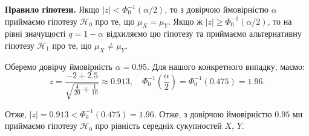 \documentclass{../hw_template}
\begin{document}
\textbf{Правило гіпотези.} Якщо $|z| < \Phi_0^{-1}(\alpha/2)$, то з довірчою
ймовірністю $\alpha$ приймаємо гіпотезу $\mathcal{H}_0$ про те, що $\mu_X =
\mu_Y$. Якщо ж $|z| \geq \Phi_0^{-1}(\alpha/2)$, то на рівні значущості
$q=1-\alpha$ відхиляємо цю гіпотезу та приймаємо альтернативну гіпотезу
$\mathcal{H}_1$ про те, що $\mu_X \neq \mu_Y$. 

Оберемо довірчу ймовірність $\alpha = 0.95$. Для нашого конкретного випадку, маємо:
\begin{equation*}
    z = \frac{-2 + 2.5}{\sqrt{\frac{4}{20} + \frac{1}{10}}} \approx 0.913, \quad \Phi_0^{-1}\left(\frac{\alpha}{2}\right) = \Phi_0^{-1}(0.475) = 1.96.
\end{equation*}

Отже, $|z| = 0.913 < \Phi_0^{-1}(0.475) = 1.96$. Отже, з довірчою ймовірністю $0.95$ ми приймаємо гіпотезу $\mathcal{H}_0$ про рівність середніх сукупностей $X$, $Y$.
\end{document}
